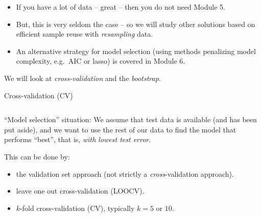 \documentclass[10pt,ignorenonframetext,]{beamer}
\providecommand{\tightlist}{%
  \setlength{\itemsep}{0pt}\setlength{\parskip}{0pt}}
\begin{document}
\begin{frame}

\begin{itemize}
\item
  If you have a lot of data -- great -- then you do not need Module 5.
\item
  But, this is very seldom the case -- so we will study other solutions
  based on efficient sample reuse with \emph{resampling} data.
\item
  An alternative strategy for model selection (using methods penalizing
  model complexity, e.g.~AIC or lasso) is covered in Module 6.
\end{itemize}

We will look at \emph{cross-validation} and the \emph{bootstrap}.

\end{frame}

\begin{frame}{Cross-validation (CV)}
\protect\hypertarget{cross-validation-cv}{}

\(~\)

``Model selection'' situation: We assume that test data is available
(and has been put aside), and we want to use the rest of our data to
find the model that performs ``best'', that is, \emph{with lowest test
error}.

\vspace{2mm}

This can be done by:

\begin{itemize}
\tightlist
\item
  the validation set approach (not strictly a \emph{cross}-validation
  approach).
\item
  leave one out cross-validation (LOOCV).
\item
  \(k\)-fold cross-validation (CV), typically \(k=5\) or \(10\).
\end{itemize}

\end{frame}
\end{document}
